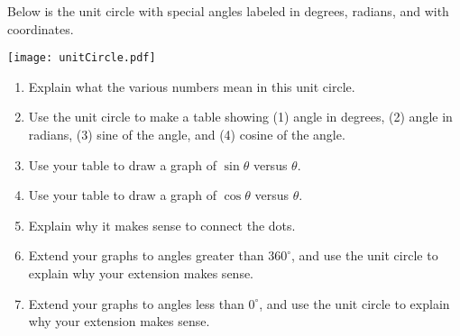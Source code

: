 \documentclass{ximera}
\begin{document}
\begin{problem}
Below is the unit circle with special angles labeled in degrees, radians, and with coordinates.%
\begin{image}
\texttt{[image: unitCircle.pdf]}
\end{image}
\begin{enumerate}
\item Explain what the various numbers mean in this unit circle.  
\item Use the unit circle to make a table showing (1) angle in degrees, (2) angle in radians, (3) sine of the angle, and (4) cosine of the angle.  
\item Use your table to draw a graph of $\sin\theta$ versus $\theta$.
\item Use your table to draw a graph of $\cos\theta$ versus $\theta$.
\item Explain why it makes sense to connect the dots. 
\item Extend your graphs to angles greater than $360^\circ$, and use the unit circle to explain why your extension makes sense. 
\item Extend your graphs to angles less than $0^\circ$, and use the unit circle to explain why your extension makes sense.
\end{enumerate}
\end{problem}

%
%
%

\end{document}
